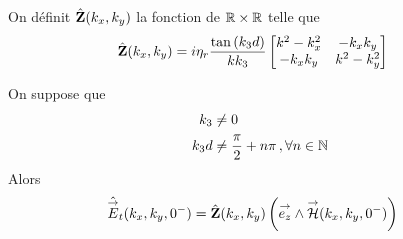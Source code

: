         \begin{defn}
          \label{def:plan:impedance:1c}
          On définit \(\hat {\mathbf{Z}}(k_x,k_y)\) la fonction de \(\mathbb R \times \mathbb R\) telle que
          \begin{align*}
            \hat {\mathbf{Z}}(k_x,k_y) &= i\eta_r\dfrac{\tan\left(k_3d\right)}{k k_3}
            \begin{bmatrix}
              k^2-k_x^2  & -k_xk_y
              \\
              -k_xk_y & k^2-k_y^2
            \end{bmatrix}
          \end{align*}
        \end{defn}

        \begin{prop}
            \label{prop:imp_plan:symb_z:1c}
            On suppose que
            \begin{align*}
                k_3     & \not = 0 \\
                k_3d    & \not = \dfrac{\pi}{2}+n\pi\,, \forall n \in \mathbb N
            \end{align*}
            Alors
            \begin{align*}
              \hat {{\overset{\rightarrow}{E}}}_t(k_x,k_y,0^-) &= \hat {\mathbf{Z}}(k_x,k_y) \left({\overset{\rightarrow}{e_z}} \wedge {\overset{\rightarrow}{\mathcal{H}}}(k_x,k_y,0^-)\right)
            \end{align*}
        \end{prop}

